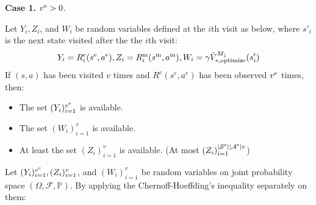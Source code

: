 \textbf{Case 1.} $v^\text{e} > 0$.

Let $Y_i, Z_i$, and $W_i$ be random variables defined at the $i$th visit as below, where $s'_i$ is the next state visited after the the $i$th visit:
%
\begin{equation*}
        Y_i = R^\text{e}_i(s^\text{e}, a^\text{e}), Z_i = R^\text{m}_i(s^\text{m}, a^\text{m}), W_i = \gamma \tilde{V}^{{M}_{\downarrow}}_{*, \text{optimize}}(s'_i)
\end{equation*}
%
If $(s, a)$ has been visited $v$ times and $R^e(s^e, a^e)$ has been observed $v^\text{e}$ times, then:
    \begin{itemize}
        \item The set $(Y_i)_{i=1}^{v^\text{e}}$ is available.
        \item The set $(W_i)_{i=1}^v$ is available.
        \item At least the set $(Z_i)_{i=1}^v$ is available. (At most $(Z_i)_{i=1}^{|\mathcal{S}^\text{e}||\mathcal{A}^\text{e}|v}$)
    \end{itemize}
    Let $(Y_i)_{i = 1}^{v^\text{e}}, (Z_i)_{i = 1}^{v}$, and $(W_i)_{i = 1}^{v}$ be random variables on joint probability space $(\Omega, \mathcal{F}, \mathbb{P})$. By applying the Chernoff-Hoeffding's inequality separately on them:
    
